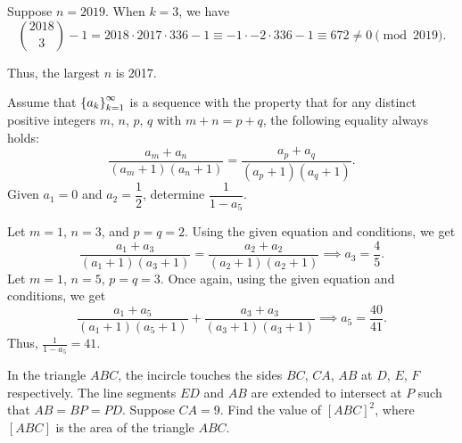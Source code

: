  Suppose $n = 2019$. When $k = 3$, we have \[\binom{2018}{3} - 1 = 2018 \cdot 2017 \cdot 336 - 1 \equiv -1 \cdot -2 \cdot 336 - 1 \equiv 672 \neq 0 \pmod{2019}.\]

Thus, the largest $n$ is 2017.

\begin{question}[41]\label{A::2020-O-1-19}
    Assume that $\left\lbrace a_k \right\rbrace_{k=1}^\infty$ is a sequence with the property that for any distinct positive integers $m$, $n$, $p$, $q$ with $m + n = p + q$, the following equality always holds: \[\frac{a_m + a_n}{(a_m + 1)(a_n + 1)} = \frac{a_p + a_q}{(a_p + 1)(a_q + 1)}.\] Given $a_1 = 0$ and $a_2 = \dfrac12$, determine $\dfrac1{1 - a_5}$.
\end{question}

Let $m = 1$, $n = 3$, and $p = q = 2$. Using the given equation and conditions, we get \[\frac{a_1 + a_3}{(a_1 + 1)(a_3 + 1)} = \frac{a_2 + a_2}{(a_2 + 1)(a_2 + 1)} \implies a_3 = \frac45.\] Let $m = 1$, $n = 5$, $p = q = 3$. Once again, using the given equation and conditions, we get \[\frac{a_1 + a_5}{(a_1 + 1)(a_5 + 1)} + \frac{a_3 + a_3}{(a_3 + 1)(a_3 + 1)} \implies a_5 = \frac{40}{41}.\] Thus, $\frac{1}{1 - a_5} = 41$.

\clearpage
\begin{question}[140]\label{A::2020-O-1-20}
    In the triangle $ABC$, the incircle touches the sides $BC$, $CA$, $AB$ at $D$, $E$, $F$ respectively. The line segments $ED$ and $AB$ are extended to intersect at $P$ such that $AB = BP = PD$. Suppose $CA = 9$. Find the value of $[ABC]^2$, where $[ABC]$ is the area of the triangle $ABC$.
\end{question}

\begin{center}
\end{center}

